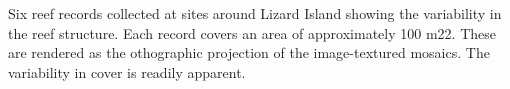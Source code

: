 Six reef records collected at sites around Lizard Island showing the variability in the reef structure. Each record covers an area of approximately 100 m22. These are rendered as the othographic projection of the image-textured mosaics. The variability in cover is readily apparent.